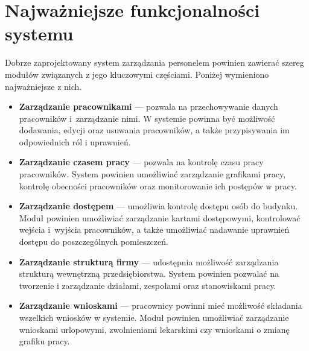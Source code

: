
\section{Najważniejsze funkcjonalności systemu}


Dobrze zaprojektowany system zarządzania personelem powinien zawierać szereg modułów związanych z jego kluczowymi częściami. Poniżej wymieniono najważniejsze z nich.

\begin{itemize}
    \item \textbf{Zarządzanie pracownikami} --- pozwala na przechowywanie danych pracowników i~zarządzanie nimi. W systemie powinna być możliwość dodawania, edycji oraz usuwania pracowników, a także przypisywania im odpowiednich ról i uprawnień.
    \item \textbf{Zarządzanie czasem pracy} --- pozwala na kontrolę czasu pracy pracowników. System powinien umożliwiać zarządzanie grafikami pracy, kontrolę obecności pracowników oraz monitorowanie ich postępów w pracy.
    \item \textbf{Zarządzanie dostępem} --- umożliwia kontrolę dostępu osób do budynku. Moduł powinien umożliwiać zarządzanie kartami dostępowymi, kontrolować wejścia i~wyjścia pracowników, a także umożliwiać nadawanie uprawnień dostępu do poszczególnych pomieszczeń.
    \item \textbf{Zarządzanie strukturą firmy} --- udostępnia możliwość zarządzania strukturą wewnętrzną przedsiębiorstwa. System powinien pozwalać na tworzenie i zarządzanie działami, zespołami oraz stanowiskami pracy.
    \item \textbf{Zarządzanie wnioskami} --- pracownicy powinni mieć możliwość składania wszelkich wniosków w systemie. Moduł powinien umożliwiać zarządzanie wnioskami urlopowymi, zwolnieniami lekarskimi czy wnioskami o zmianę grafiku pracy.
\end{itemize}

